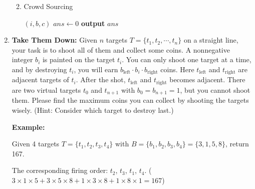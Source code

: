 \documentclass[12pt,a4paper]{article}
\makeatletter
\newtheorem*{solution}{Solution}
\theoremstyle{definition}
\renewenvironment{solution}[1][Solution] {\par\pushQED{\qed}\normalfont\topsep6\p@\@plus6\p@\relax\trivlist\item[\hskip\labelsep\bfseries#1\@addpunct{.}]\ignorespaces}{\popQED\endtrivlist\@endpefalse} \makeatother
\makeatother
\begin{document}
\begin{enumerate}
\begin{enumerate}
\begin{solution}
	\begin{minipage}{0.9\textwidth}
		\begin{algorithm}[H]
			\BlankLine
			\caption{Crowd Sourcing}
			\BlankLine
			\BlankLine
			\opt$(i,b,c)$
			\BlankLine
			$ans\leftarrow 0$\;
			\textbf{output} $ans$\;
		\end{algorithm}
		
	\end{minipage}
\end{solution}

\end{enumerate}

\newpage
\item
\textbf{Take Them Down:} Given $n$ targets $T=\{t_1, t_2, \cdots, t_n\}$ on a straight line, your task is to shoot all of them and collect some coins. A nonnegative integer $b_i$ is painted on the target $t_i$. You can only shoot one target at a time, and by destroying $t_i$, you will earn $b_{\text{left}} \cdot b_i \cdot b_{\text{right}}$ coins. Here $t_{\text{left}}$ and $t_{\text{right}}$ are adjacent targets of $t_i$. After the shot, $t_{\text{left}}$ and $t_{\text{right}}$ becomes adjacent. There are two virtual targets $t_0$ and $t_{n+1}$ with $b_0 = b_{n+1} = 1$, but you cannot shoot them. Please find the maximum coins you can collect by shooting the targets wisely. {\color{blue}(Hint: Consider which target to destroy last.)}

\textbf{Example:}

Given 4 targets $T=\{t_1, t_2, t_3, t_4\}$ with $B=\{b_1, b_2, b_3, b_4\}=\{3,1,5,8\}$, return 167.

The corresponding firing order: $t_2$, $t_3$, $t_1$, $t_4$. ($3\times1\times5+3\times5\times8+1\times3\times8+1\times8\times1=167$)


\end{enumerate}
\end{document}
